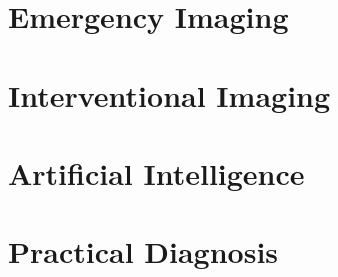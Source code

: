 \documentclass[12pt,oneside]{book}
\begin{document}
\part{Emergency Imaging}








\part{Interventional Imaging}







\part{Artificial Intelligence}









\part{Practical Diagnosis}












\appendix








\backmatter
\end{document}
